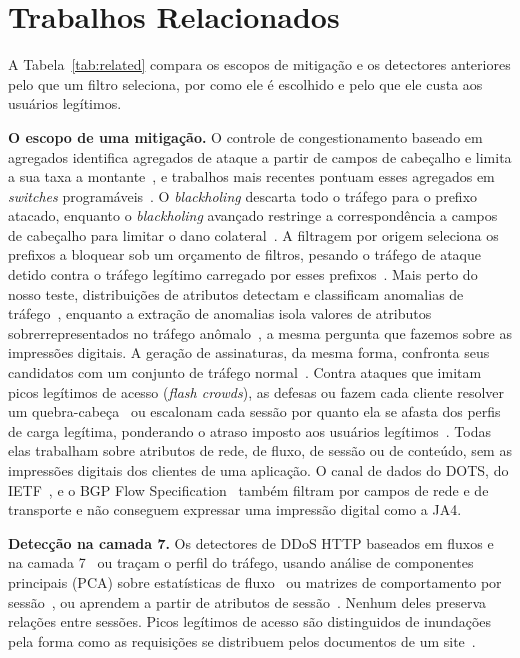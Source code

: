 \documentclass[conference,letterpaper,10pt]{IEEEtran}
\newcommand\1{\textit{(i)}}
\newcommand\2{\textit{(ii)}}
\newcommand\3{\textit{(iii)}}
\begin{document}
\section{Trabalhos Relacionados}
\label{sec:related}

A Tabela~\ref{tab:related} compara os escopos de mitigação e os detectores anteriores pelo que um filtro seleciona, por como ele é escolhido e pelo que ele custa aos usuários legítimos.

\textbf{O escopo de uma mitigação.} O controle de congestionamento baseado em agregados identifica agregados de ataque a partir de campos de cabeçalho e limita a sua taxa a montante~\cite{mahajan2002pushback}, e trabalhos mais recentes pontuam esses agregados em \textit{switches} programáveis~\cite{alcoz2022accturbo}. O \textit{blackholing} descarta todo o tráfego para o prefixo atacado, enquanto o \textit{blackholing} avançado restringe a correspondência a campos de cabeçalho para limitar o dano colateral~\cite{dietzel2018stellar}. A filtragem por origem seleciona os prefixos a bloquear sob um orçamento de filtros, pesando o tráfego de ataque detido contra o tráfego legítimo carregado por esses prefixos~\cite{soldo2012filtering}. Mais perto do nosso teste, distribuições de atributos detectam e classificam anomalias de tráfego~\cite{lakhina2005mining}, enquanto a extração de anomalias isola valores de atributos sobrerrepresentados no tráfego anômalo~\cite{silveira2010urca,brauckhoff2009extraction}, a mesma pergunta que fazemos sobre as impressões digitais. A geração de assinaturas, da mesma forma, confronta seus candidatos com um conjunto de tráfego normal~\cite{li2006hamsa}. Contra ataques que imitam picos legítimos de acesso (\textit{flash crowds}), as defesas ou fazem cada cliente resolver um quebra-cabeça~\cite{kandula2005botz} ou escalonam cada sessão por quanto ela se afasta dos perfis de carga legítima, ponderando o atraso imposto aos usuários legítimos~\cite{ranjan2009ddosshield}. Todas elas trabalham sobre atributos de rede, de fluxo, de sessão ou de conteúdo, sem as impressões digitais dos clientes de uma aplicação. O canal de dados do DOTS, do IETF~\cite{dots2020data}, e o BGP Flow Specification~\cite{rfc8955flowspec} também filtram por campos de rede e de transporte e não conseguem expressar uma impressão digital como a JA4.

\textbf{Detecção na camada 7.} Os detectores de DDoS HTTP baseados em fluxos e na camada 7~\cite{odusami2020survey} ou traçam o perfil do tráfego, usando análise de componentes principais (PCA) sobre estatísticas de fluxo~\cite{fernandes2015autonomous} ou matrizes de comportamento por sessão~\cite{bharathi2012pca}, ou aprendem a partir de atributos de sessão~\cite{kemp2023approach}. Nenhum deles preserva relações entre sessões. Picos legítimos de acesso são distinguidos de inundações pela forma como as requisições se distribuem pelos documentos de um site~\cite{xie2009monitoring}.
\end{document}
